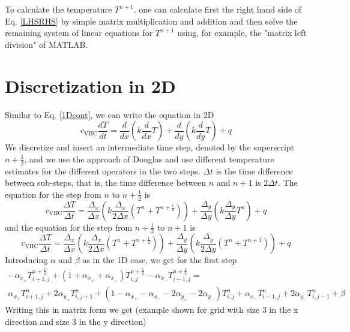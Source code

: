 \documentclass{scrartcl}
\newcommand{\VHC}{c_\mathrm{VHC}}
\begin{document}
To calculate the temperature $T^{n+1}$, one can calculate first the right hand side of Eq. \ref{LHSRHS} by simple matrix multiplication and addition and then solve the remaining system of linear equations for $T^{n+1}$ using, for example, the "matrix left division" of MATLAB.



\section{Discretization in 2D}
Similar to Eq. \ref{1Dcont}, we can write the equation in 2D
\begin{equation}
\VHC \frac{dT}{dt} = \frac d {dx} \left( k \frac d {dx} T \right) + \frac d {dy} \left( k \frac d {dy} T \right) + q
\end{equation}
We discretize and insert an intermediate time step, denoted by the superscript $n + \frac 1 2$, and we use the approach of Douglas and use different temperature estimates for the different operators in the two steps. $\Delta t$ is the time difference between sub-steps, that is, the time difference between $n$ and $n+1$ is $2\Delta t$. The equation for the step from $n$ to $n + \frac 1 2$ is
\begin{equation}
\VHC \frac{\Delta T}{\Delta t} = \frac{\Delta_x}{\Delta x} \left( k \frac{\Delta_x}{2\Delta x} \left( T^n + T^{n+\frac 1 2} \right) \right) + \frac{\Delta_y}{\Delta y} \left( k \frac{\Delta_y}{\Delta y} T^n \right) + q
\end{equation}
and the equation for the step from $n + \frac 1 2$ to $n+1$ is
\begin{equation}
\VHC \frac{\Delta T}{\Delta t} = \frac{\Delta_x}{\Delta x} \left( k \frac{\Delta_x}{2\Delta x} \left( T^n + T^{n+\frac 1 2} \right) \right) + \frac{\Delta_y}{\Delta y} \left( k \frac{\Delta_y}{2\Delta y} \left( T^n + T^{n+1} \right) \right) + q
\end{equation}
Introducing $\alpha$ and $\beta$ as in the 1D case, we get for the first step
\begin{multline}
-\alpha_{x_+} T_{i+1,j}^{n+ \frac 1 2} + \left( 1 + \alpha_{x_+} + \alpha_{x_-} \right) T_{i,j}^{n+\frac 1 2} - \alpha_{x_-} T_{i-1,j}^{n+\frac 1 2} =\\ \alpha_{x_+} T_{i+1,j}^n + 2\alpha_{y_+} T_{i,j+1}^n + \left( 1 - \alpha_{x_+} - \alpha_{x_-} - 2\alpha_{y_+} - 2\alpha_{y_-} \right) T_{i,j}^n + \alpha_{x_-} T_{i-1,j}^n + 2\alpha_{y_-} T_{i,j-1}^n + \beta
\end{multline}
Writing this in matrix form we get (example shown for grid with size 3 in the x direction and size 3 in the y direction)
\end{document}
